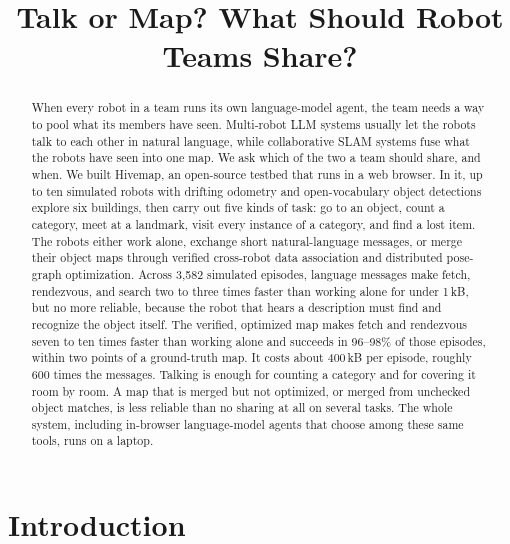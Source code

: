 \documentclass[conference]{IEEEtran}
\begin{document}
\title{Talk or Map? What Should Robot Teams Share?}

\author{
}

\maketitle

\begin{abstract}
When every robot in a team runs its own language-model agent, the team needs a way to pool what its members have seen.
Multi-robot LLM systems usually let the robots talk to each other in natural language, while collaborative SLAM systems fuse what the robots have seen into one map.
We ask which of the two a team should share, and when.
We built Hivemap, an open-source testbed that runs in a web browser.
In it, up to ten simulated robots with drifting odometry and open-vocabulary object detections explore six buildings, then carry out five kinds of task: go to an object, count a category, meet at a landmark, visit every instance of a category, and find a lost item.
The robots either work alone, exchange short natural-language messages, or merge their object maps through verified cross-robot data association and distributed pose-graph optimization.
Across 3{,}582 simulated episodes, language messages make fetch, rendezvous, and search two to three times faster than working alone for under 1\,kB, but no more reliable, because the robot that hears a description must find and recognize the object itself.
The verified, optimized map makes fetch and rendezvous seven to ten times faster than working alone and succeeds in 96--98\% of those episodes, within two points of a ground-truth map.
It costs about 400\,kB per episode, roughly 600 times the messages.
Talking is enough for counting a category and for covering it room by room.
A map that is merged but not optimized, or merged from unchecked object matches, is less reliable than no sharing at all on several tasks.
The whole system, including in-browser language-model agents that choose among these same tools, runs on a laptop.
\end{abstract}

\section{Introduction}\label{sec:intro}
\end{document}
